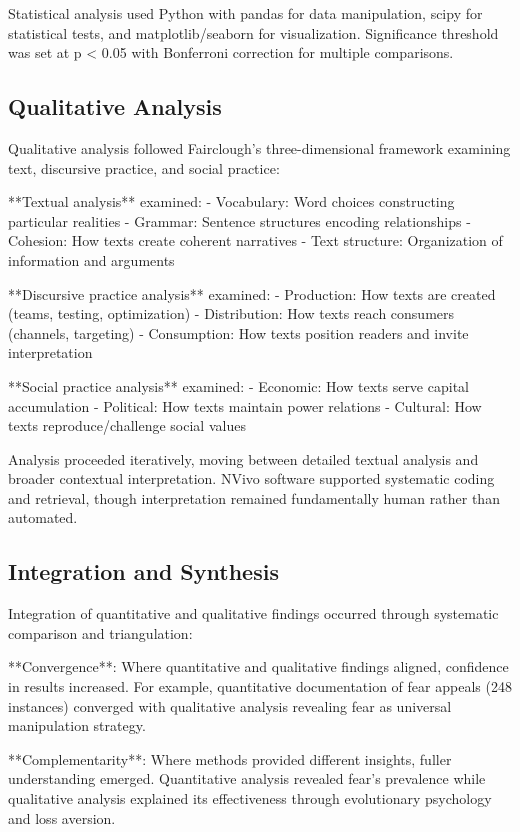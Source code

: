 Statistical analysis used Python with pandas for data manipulation, scipy for statistical tests, and matplotlib/seaborn for visualization. Significance threshold was set at p < 0.05 with Bonferroni correction for multiple comparisons.

\subsection{Qualitative Analysis}

Qualitative analysis followed Fairclough's three-dimensional framework examining text, discursive practice, and social practice:

**Textual analysis** examined:
- Vocabulary: Word choices constructing particular realities
- Grammar: Sentence structures encoding relationships
- Cohesion: How texts create coherent narratives
- Text structure: Organization of information and arguments

**Discursive practice analysis** examined:
- Production: How texts are created (teams, testing, optimization)
- Distribution: How texts reach consumers (channels, targeting)
- Consumption: How texts position readers and invite interpretation

**Social practice analysis** examined:
- Economic: How texts serve capital accumulation
- Political: How texts maintain power relations
- Cultural: How texts reproduce/challenge social values

Analysis proceeded iteratively, moving between detailed textual analysis and broader contextual interpretation. NVivo software supported systematic coding and retrieval, though interpretation remained fundamentally human rather than automated.

\subsection{Integration and Synthesis}

Integration of quantitative and qualitative findings occurred through systematic comparison and triangulation:

**Convergence**: Where quantitative and qualitative findings aligned, confidence in results increased. For example, quantitative documentation of fear appeals (248 instances) converged with qualitative analysis revealing fear as universal manipulation strategy.

**Complementarity**: Where methods provided different insights, fuller understanding emerged. Quantitative analysis revealed fear's prevalence while qualitative analysis explained its effectiveness through evolutionary psychology and loss aversion.

